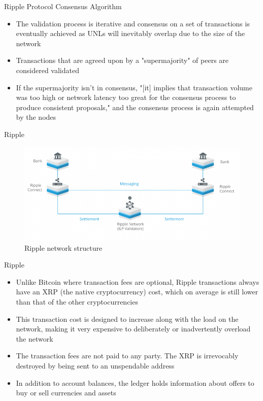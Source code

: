 \documentclass[10pt]{beamer}
\begin{document}

\begin{frame}{Ripple Protocol Consensus Algorithm}
	\begin{itemize}
		\item The validation process is iterative and consensus on a set of transactions is eventually achieved as UNLs will inevitably overlap due to the size of the network
		\item Transactions that are agreed upon by a "supermajority" of peers are considered validated
		\item If the supermajority isn't in consensus, "[it] implies that transaction volume was too high or network latency too great for the consensus process to produce consistent proposals," and the consensus process is again attempted by the nodes
	\end{itemize}
\end{frame}


\begin{frame}{Ripple}
	\begin{figure}[]
		\centering
		\includegraphics  [scale=0.3]{Images/ripple1}
		\caption{Ripple network structure}
	\end{figure}
\end{frame}


\begin{frame}{Ripple}
	\begin{itemize}
		\item Unlike Bitcoin where transaction fees are optional, Ripple transactions always have an XRP (the native cryptocurrency) cost, which on average is still lower than that of the other cryptocurrencies
		\item This transaction cost is designed to increase along with the load on the network, making it very expensive to deliberately or inadvertently overload the network
		\item The transaction fees are not paid to any party. The XRP is irrevocably destroyed by being sent to an unspendable address
		\item In addition to account balances, the ledger holds information about offers to buy or sell currencies and assets
	\end{itemize}
\end{frame}
\end{document}
